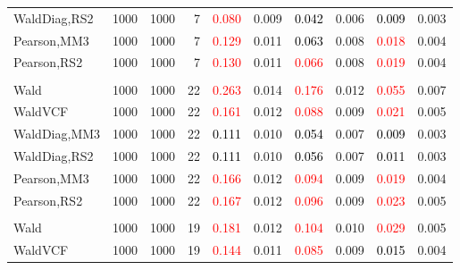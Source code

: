 \documentclass[
]{article}
\begin{document}
\begin{table}[H]
{\begin{tabular}[t]{lrrrrrrlrr}
\hspace{1em}WaldDiag,RS2 & 1000 & 1000 & 7 & \textcolor{red}{0.080} & 0.009 & \textcolor{black}{0.042} & 0.006 & \textcolor{black}{0.009} & 0.003\\
\hspace{1em}Pearson,MM3 & 1000 & 1000 & 7 & \textcolor{red}{0.129} & 0.011 & \textcolor{black}{0.063} & 0.008 & \textcolor{red}{0.018} & 0.004\\
\hspace{1em}Pearson,RS2 & 1000 & 1000 & 7 & \textcolor{red}{0.130} & 0.011 & \textcolor{red}{0.066} & 0.008 & \textcolor{red}{0.019} & 0.004\\
\addlinespace[0.3em]
\multicolumn{10}{l}{\textbf{1F 15V}}\\
\hspace{1em}Wald & 1000 & 1000 & 22 & \textcolor{red}{0.263} & 0.014 & \textcolor{red}{0.176} & 0.012 & \textcolor{red}{0.055} & 0.007\\
\hspace{1em}WaldVCF & 1000 & 1000 & 22 & \textcolor{red}{0.161} & 0.012 & \textcolor{red}{0.088} & 0.009 & \textcolor{red}{0.021} & 0.005\\
\hspace{1em}WaldDiag,MM3 & 1000 & 1000 & 22 & \textcolor{black}{0.111} & 0.010 & \textcolor{black}{0.054} & 0.007 & \textcolor{black}{0.009} & 0.003\\
\hspace{1em}WaldDiag,RS2 & 1000 & 1000 & 22 & \textcolor{black}{0.111} & 0.010 & \textcolor{black}{0.056} & 0.007 & \textcolor{black}{0.011} & 0.003\\
\hspace{1em}Pearson,MM3 & 1000 & 1000 & 22 & \textcolor{red}{0.166} & 0.012 & \textcolor{red}{0.094} & 0.009 & \textcolor{red}{0.019} & 0.004\\
\hspace{1em}Pearson,RS2 & 1000 & 1000 & 22 & \textcolor{red}{0.167} & 0.012 & \textcolor{red}{0.096} & 0.009 & \textcolor{red}{0.023} & 0.005\\
\addlinespace[0.3em]
\multicolumn{10}{l}{\textbf{2F 10V}}\\
\hspace{1em}Wald & 1000 & 1000 & 19 & \textcolor{red}{0.181} & 0.012 & \textcolor{red}{0.104} & 0.010 & \textcolor{red}{0.029} & 0.005\\
\hspace{1em}WaldVCF & 1000 & 1000 & 19 & \textcolor{red}{0.144} & 0.011 & \textcolor{red}{0.085} & 0.009 & \textcolor{black}{0.015} & 0.004\\

\end{tabular}}
\end{table}
\end{document}
